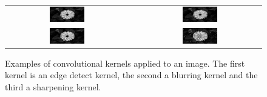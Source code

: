 \begin{description}
\begin{figure}
\begin{tabular}{ccc}
                \includegraphics[width=0.3\textwidth]{./pictures/method/original_convolution.png} &
                \raisebox{1.2\height}{
                \begin{minipage}{6cm}
                    \begin{equation*}
                        \frac{1}{16}\begin{pmatrix}
                            1 & 2 & 1 \\
                            2 & 4 & 2  \\
                            1 & 2 & 1
                        \end{pmatrix}
                    \end{equation*}
                \end{minipage}}
                    &
                \includegraphics[width=0.3\textwidth]{./pictures/method/blurred_convolution.png} \\

                \includegraphics[width=0.3\textwidth]{./pictures/method/original_convolution.png} &
                \raisebox{1.2\height}{
                \begin{minipage}{6cm}
                    \begin{equation*}
                        \begin{pmatrix}
                            0  & -1 & 0  \\
                            -1 & 5  & -1 \\
                            0  & -1 & 0
                        \end{pmatrix}
                    \end{equation*}
                \end{minipage}}
                    &
                \includegraphics[width=0.3\textwidth]{./pictures/method/sharpened_convolution.png}
            \end{tabular}
            \caption{Examples of convolutional kernels applied to an image. The
                first kernel is an edge detect kernel, the second a blurring
                kernel and the third a sharpening kernel.}
            \label{fig:convolution_example}
        \end{figure}


\end{description}
